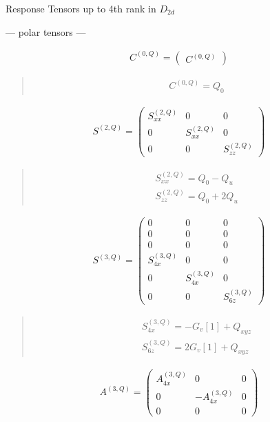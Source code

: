 \documentclass[fleqn,10pt]{jsarticle}
\begin{document}
\setcounter{MaxMatrixCols}{16}

\begin{center}
\LARGE
Response Tensors up to 4th rank in $D_{2d}$
\end{center}
\begin{center}\LARGE --- polar tensors ---\end{center}
\begin{align*}
C^{(0,Q)} = \begin{pmatrix} C^{(0,Q)} \end{pmatrix}
\end{align*}
\begin{quote}
\begin{align*}
& C^{(0,Q)} = Q_{0}
\end{align*}
\end{quote}
\begin{align*}
S^{(2,Q)} = \begin{pmatrix} S^{(2,Q)}_{xx} & 0 & 0 \\ 0 & S^{(2,Q)}_{xx} & 0 \\ 0 & 0 & S^{(2,Q)}_{zz} \end{pmatrix}
\end{align*}
\begin{quote}
\begin{align*}
& S^{(2,Q)}_{xx} = Q_{0} - Q_{u} \\
& S^{(2,Q)}_{zz} = Q_{0} + 2 Q_{u}
\end{align*}
\end{quote}
\begin{align*}
S^{(3,Q)} = \begin{pmatrix} 0 & 0 & 0 \\ 0 & 0 & 0 \\ 0 & 0 & 0 \\ S^{(3,Q)}_{4x} & 0 & 0 \\ 0 & S^{(3,Q)}_{4x} & 0 \\ 0 & 0 & S^{(3,Q)}_{6z} \end{pmatrix}
\end{align*}
\begin{quote}
\begin{align*}
& S^{(3,Q)}_{4x} = - G_{v}[1] + Q_{xyz} \\
& S^{(3,Q)}_{6z} = 2 G_{v}[1] + Q_{xyz}
\end{align*}
\end{quote}
\begin{align*}
A^{(3,Q)} = \begin{pmatrix} A^{(3,Q)}_{4x} & 0 & 0 \\ 0 & - A^{(3,Q)}_{4x} & 0 \\ 0 & 0 & 0 \end{pmatrix}
\end{align*}
\end{document}
